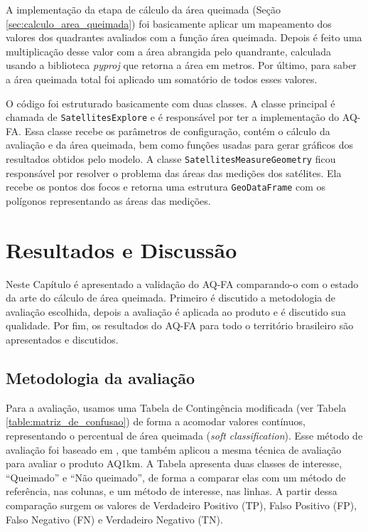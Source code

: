 \documentclass[cic,tc]{iiufrgs}
\begin{document}
A implementação da etapa de cálculo da área queimada (Seção \ref{sec:calculo_area_queimada}) foi basicamente aplicar um mapeamento dos valores dos quadrantes avaliados com a função área queimada. Depois é feito uma multiplicação desse valor com a área abrangida pelo quandrante, calculada usando a biblioteca \textit{pyproj} que retorna a área em metros. Por último, para saber a área queimada total foi aplicado um somatório de todos esses valores.

O código foi estruturado basicamente com duas classes. A classe principal é chamada de \texttt{SatellitesExplore} e é responsável por ter a implementação do AQ-FA. Essa classe recebe os parâmetros de configuração, contém o cálculo da avaliação e da área queimada, bem como funções usadas para gerar gráficos dos resultados obtidos pelo modelo. A classe \texttt{SatellitesMeasureGeometry} ficou responsável por resolver o problema das áreas das medições dos satélites. Ela recebe os pontos dos focos e retorna uma estrutura \texttt{GeoDataFrame} com os polígonos representando as áreas das medições.



\chapter{Resultados e Discussão}
\label{chp:resultados_discussão}

Neste Capítulo é apresentado a validação do AQ-FA comparando-o com o estado da arte do cálculo de área queimada. Primeiro é discutido a metodologia de avaliação escolhida, depois a avaliação é aplicada ao produto e é discutido sua qualidade. Por fim, os resultados do AQ-FA para todo o território brasileiro são apresentados e discutidos.

\section{Metodologia da avaliação}
\label{sec:metodologia_avaliacao}

Para a avaliação, usamos uma Tabela de Contingência modificada (ver Tabela \ref{table:matriz_de_confusao}) de forma a acomodar valores contínuos, representando o percentual de área queimada (\textit{soft classification}). Esse método de avaliação foi baseado em \citet{libonati2015algorithm}, que também aplicou a mesma técnica de avaliação para avaliar o produto AQ1km. A Tabela apresenta duas classes de interesse, ``Queimado'' e ``Não queimado'', de forma a comparar elas com um método de referência, nas colunas, e um método de interesse, nas linhas. A partir dessa comparação surgem os valores de Verdadeiro Positivo (TP), Falso Positivo (FP), Falso Negativo (FN) e Verdadeiro Negativo (TN).
\end{document}
